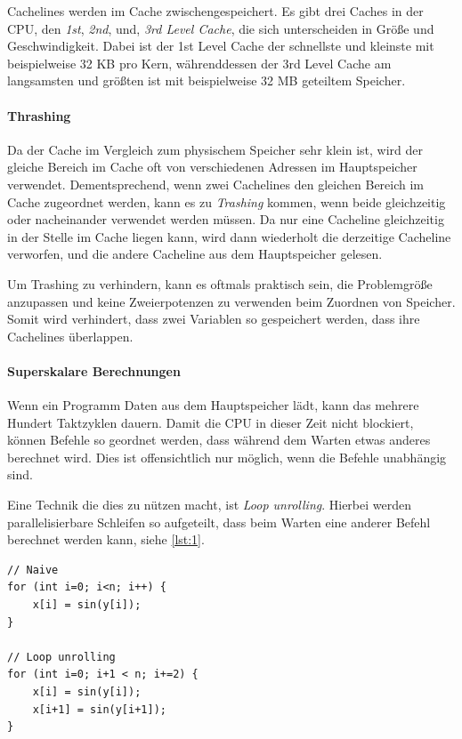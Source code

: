 Cachelines werden im Cache zwischengespeichert.
Es gibt drei Caches in der CPU, den \emph{1st}, \emph{2nd}, und, \emph{3rd Level Cache}, die sich unterscheiden in Größe und Geschwindigkeit.
Dabei ist der 1st Level Cache der schnellste und kleinste mit beispielweise 32 KB pro Kern, währenddessen der 3rd Level Cache am langsamsten und größten ist mit beispielweise 32 MB geteiltem Speicher.

\paragraph{Thrashing}
Da der Cache im Vergleich zum physischem Speicher sehr klein ist, wird der gleiche Bereich im Cache oft von verschiedenen Adressen im Hauptspeicher verwendet.
Dementsprechend, wenn zwei Cachelines den gleichen Bereich im Cache zugeordnet werden, kann es zu \emph{Trashing} kommen, wenn beide gleichzeitig oder nacheinander verwendet werden müssen.
Da nur eine Cacheline gleichzeitig in der Stelle im Cache liegen kann, wird dann wiederholt die derzeitige Cacheline verworfen, und die andere Cacheline aus dem Hauptspeicher gelesen.

Um Trashing zu verhindern, kann es oftmals praktisch sein, die Problemgröße anzupassen und keine Zweierpotenzen zu verwenden beim Zuordnen von Speicher.
Somit wird verhindert, dass zwei Variablen so gespeichert werden, dass ihre Cachelines überlappen.

\paragraph{Superskalare Berechnungen}
Wenn ein Programm Daten aus dem Hauptspeicher lädt, kann das mehrere Hundert Taktzyklen dauern.
Damit die CPU in dieser Zeit nicht blockiert, können Befehle so geordnet werden, dass während dem Warten etwas anderes berechnet wird.
Dies ist offensichtlich nur möglich, wenn die Befehle unabhängig sind.

Eine Technik die dies zu nützen macht, ist \emph{Loop unrolling}.
Hierbei werden parallelisierbare Schleifen so aufgeteilt, dass beim Warten eine anderer Befehl berechnet werden kann, siehe \autoref{lst:1}.

\begin{lstlisting}[label={lst:1}, caption={Loop unrolling über die cumulative Sinus-Funktion.}]
// Naive
for (int i=0; i<n; i++) {
    x[i] = sin(y[i]);
}

// Loop unrolling
for (int i=0; i+1 < n; i+=2) {
    x[i] = sin(y[i]);
    x[i+1] = sin(y[i+1]);
}
\end{lstlisting}

